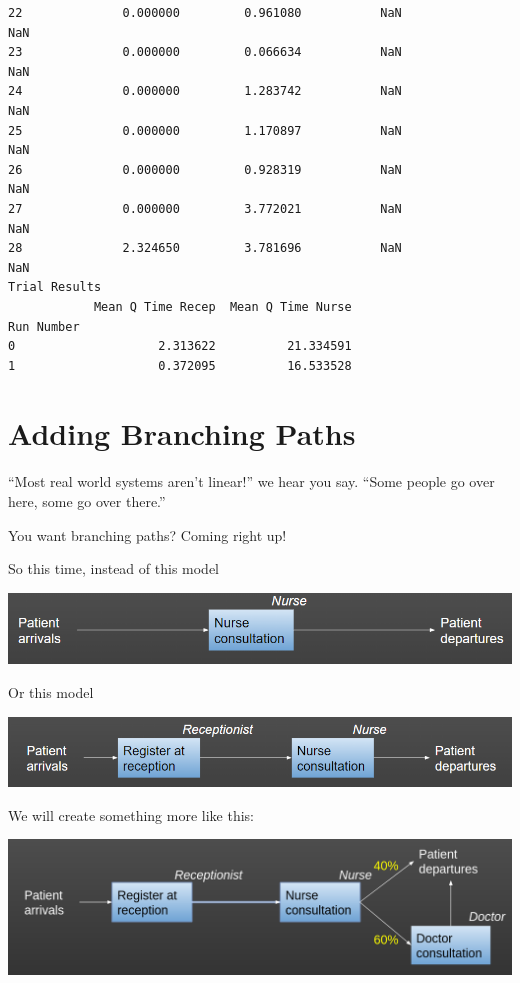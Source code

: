 \documentclass[
  letterpaper,
  DIV=11,
  numbers=noendperiod]{scrreprt}
\begin{document}
\begin{verbatim}
22              0.000000         0.961080           NaN              NaN
23              0.000000         0.066634           NaN              NaN
24              0.000000         1.283742           NaN              NaN
25              0.000000         1.170897           NaN              NaN
26              0.000000         0.928319           NaN              NaN
27              0.000000         3.772021           NaN              NaN
28              2.324650         3.781696           NaN              NaN
Trial Results
            Mean Q Time Recep  Mean Q Time Nurse
Run Number                                      
0                    2.313622          21.334591
1                    0.372095          16.533528
\end{verbatim}

\chapter{Adding Branching Paths}\label{adding-branching-paths}

``Most real world systems aren't linear!'' we hear you say. ``Some
people go over here, some go over there.''

You want branching paths? Coming right up!

So this time, instead of this model

\includegraphics{images/example_simplest_model.png}

Or this model

\includegraphics{images/example_simple_model_sequential.png}

We will create something more like this:

\includegraphics{images/example_simple_model_branching.png}
\end{document}
